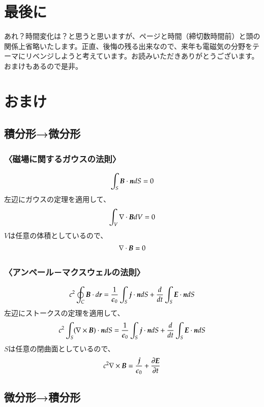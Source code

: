 \documentclass[10pt,b5paper,papersize,dvipdfmx]{jsbook}
\begin{document}
\section{最後に}
あれ？時間変化は？と思うと思いますが、ページと時間（締切数時間前）と頭の関係上省略いたします。正直、後悔の残る出来なので、来年も電磁気の分野をテーマにリベンジしようと考えています。お読みいただきありがとうございます。おまけもあるので是非。

\section{おまけ}
\subsection{積分形→微分形}
\subsubsection{〈磁場に関するガウスの法則〉}
\begin{align}
  \int_S \vb*{B}\cdot \vb*{n}dS = 0
\end{align}
左辺にガウスの定理を適用して、
\begin{align}
  \int_V \nabla\cdot\vb*{B}dV = 0
\end{align}
$V$は任意の体積としているので、
\begin{align}
  \nabla\cdot\vb*{B} = 0
\end{align}

\subsubsection{〈アンペール－マクスウェルの法則〉}
\begin{align}
  c^2 \oint_C \vb*{B}\cdot d\vb*{r}
  = \frac{1}{\epsilon_0}\int_S \vb*{j}\cdot \vb*{n}dS + \frac{d}{dt}\int_S \vb*{E}\cdot \vb*{n}dS
\end{align}
左辺にストークスの定理を適用して、
\begin{align}
  c^2 \int_S (\nabla\times\vb*{B})\cdot\vb*{n}dS
  = \frac{1}{\epsilon_0}\int_S \vb*{j}\cdot \vb*{n}dS + \frac{d}{dt}\int_S \vb*{E}\cdot \vb*{n}dS
\end{align}
$S$は任意の閉曲面としているので、
\begin{align}
  c^2 \nabla\times\vb*{B} 
  = \frac{\vb*{j}}{\epsilon_0} + \frac{\partial\vb*{E}}{\partial t}
\end{align}

\subsection{微分形→積分形}
\end{document}
